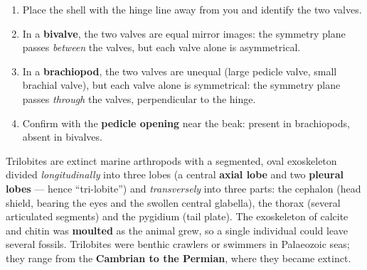 \documentclass[11pt]{article}
\newcommand{\cle}[1]{{\popxbold\color{popdark}#1}}
\newcounter{popsec}
\newcounter{popsub}
\newcommand{\courssub}[1]{%
  \stepcounter{popsub}%
  \par\vspace{9pt}\noindent{\popxbold\fontsize{11.5}{13}\selectfont\color{popink}{\color{poporange}\thepopsec.\thepopsub}\hspace{6pt}#1}\par\nopagebreak\vspace{4pt}
}
\newcommand{\legende}[1]{\par\vspace{6pt}{\popsemi\fontsize{9}{11.5}\selectfont\color{popmuted}#1}}
\begin{document}
\begin{methode}
\begin{enumerate}
\item Place the shell with the hinge line away from you and identify the two valves.
\item In a \textbf{bivalve}, the two valves are equal mirror images: the symmetry plane passes \emph{between} the valves, but each valve alone is asymmetrical.
\item In a \textbf{brachiopod}, the two valves are unequal (large pedicle valve, small brachial valve), but each valve alone is symmetrical: the symmetry plane passes \emph{through} the valves, perpendicular to the hinge.
\item Confirm with the \textbf{pedicle opening} near the beak: present in brachiopods, absent in bivalves.
\end{enumerate}
\end{methode}

\courssub{Phylum Arthropoda: Class Trilobita}

Trilobites are extinct marine arthropods with a segmented, oval \cle{exoskeleton} divided \emph{longitudinally} into three lobes (a central \textbf{axial lobe} and two \textbf{pleural lobes} --- hence ``tri-lobite'') and \emph{transversely} into three parts: the \cle{cephalon} (head shield, bearing the eyes and the swollen central \cle{glabella}), the \cle{thorax} (several articulated segments) and the \cle{pygidium} (tail plate). The exoskeleton of calcite and chitin was \textbf{moulted} as the animal grew, so a single individual could leave several fossils. Trilobites were benthic crawlers or swimmers in Palaeozoic seas; they range from the \textbf{Cambrian to the Permian}, where they became extinct.

\begin{popfigure}
\end{popfigure}
\end{document}
